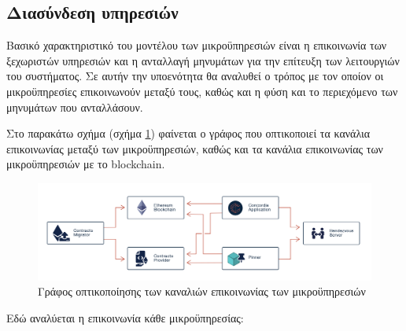 \subsection{Διασύνδεση υπηρεσιών} \label{subsection:4-3-8-service-communication}

Βασικό χαρακτηριστικό του μοντέλου των μικροϋπηρεσιών είναι η επικοινωνία των ξεχωριστών υπηρεσιών και η ανταλλαγή μηνυμάτων για την επίτευξη των λειτουργιών του συστήματος. Σε αυτήν την υποενότητα θα αναλυθεί ο τρόπος με τον οποίον οι μικροϋπηρεσίες επικοινωνούν μεταξύ τους, καθώς και η φύση και το περιεχόμενο των μηνυμάτων που ανταλλάσουν.

Στο παρακάτω σχήμα (σχήμα \ref{figure:4-3-communications-graph}) φαίνεται ο γράφος που οπτικοποιεί τα κανάλια επικοινωνίας μεταξύ των μικροϋπηρεσιών, καθώς και τα κανάλια επικοινωνίας των μικροϋπηρεσιών με το blockchain.

\begin{figure}[H]
    \centering
    \includegraphics[width=\textwidth]{assets/figures/chapter-4/4.3.communications-diagram.png}
    \caption{Γράφος οπτικοποίησης των καναλιών επικοινωνίας των μικροϋπηρεσιών}
    \label{figure:4-3-communications-graph}
\end{figure}

Εδώ αναλύεται η επικοινωνία κάθε μικροϋπηρεσίας:

